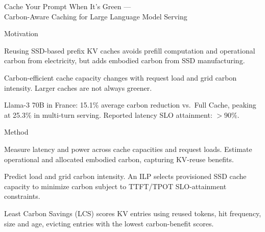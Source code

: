 \begin{frame}[t]{Cache Your Prompt When It's Green ---\\Carbon-Aware Caching for Large Language Model Serving}
\vspace{.02cm}
\begin{minipage}[t][3.25cm][t]{\linewidth}
\begin{summarysection}{Motivation}
\item {} Reusing SSD-based prefix KV caches avoids prefill computation and operational carbon from electricity, but adds embodied carbon from SSD manufacturing.
\item {} Carbon-efficient cache capacity changes with request load and grid carbon intensity. Larger caches are not always greener.
\item {} Llama-3 70B in France: 15.1\% average carbon reduction vs.\ Full Cache, peaking at 25.3\% in multi-turn serving. Reported latency SLO attainment: $>90\%$.
\end{summarysection}
\end{minipage}
\vspace{.18cm}
\begin{summarysection}{Method}
\item {} Measure latency and power across cache capacities and request loads. Estimate operational and allocated embodied carbon, capturing KV-reuse benefits.
\item {} Predict load and grid carbon intensity. An ILP selects provisioned SSD cache capacity to minimize carbon subject to TTFT/TPOT SLO-attainment constraints.
\item {} Least Carbon Savings (LCS) scores KV entries using reused tokens, hit frequency, size and age, evicting entries with the lowest carbon-benefit scores.
\end{summarysection}
\end{frame}

